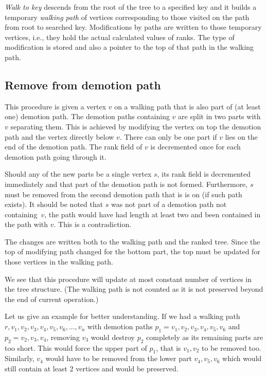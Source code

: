 \emph{Walk to key} descends from the root of the tree to a specified key and it builds a temporary {\em walking path} of vertices corresponding to those visited on the path from root to searched key. Modifications by paths are written to those temporary vertices, i.e., they hold the actual calculated values of ranks. The type of modification is stored and also a pointer to the top of that path in the walking path.

\subsection{Remove from demotion path}

This procedure is given a vertex $v$ on a walking path that is also part of (at least one) demotion path. The demotion paths containing $v$ are split in two parts with $v$ separating them. This is achieved by modifying the vertex on top the demotion path and the vertex directly below $v$. There can only be one part if $v$ lies on the end of the demotion path. The rank field of $v$ is decremented once for each demotion path going through it. 

Should any of the new parts be a single vertex $s$, its rank field is decremented immediately and that part of the demotion path is not formed. Furthermore, $s$ must be removed from the second demotion path that is is on (if such path exists). It should be noted that $s$ was not part of a demotion path not containing~$v$, the path would have had length at least two and been contained in the path with $v$. This is a contradiction. 

The changes are written both to the walking path and the ranked tree. Since the top of modifying path changed for the bottom part, the top must be updated for those vertices in the walking path.

We see that this procedure will update at most constant number of vertices in the tree structure. (The walking path is not counted as it is not preserved beyond the end of current operation.)

Let us give an example for better understanding. If we had a walking path \linebreak $r,v_1,v_2,v_3,v_4,v_5,v_6,...,v_n$ with demotion paths $p_1 = v_1,v_2,v_3,v_4,v_5,v_6$ and $p_2 = v_2,v_3,v_4$, removing $v_3$ would destroy $p_2$ completely as its remaining parts are too short. This would force the upper part of $p_1$, that is $v_1,v_2$ to be removed too. Similarly, $v_4$ would have to be removed from the lower part $v_4,v_5,v_6$ which would still contain at least 2 vertices and would be preserved.


